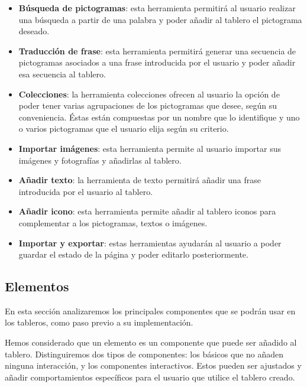 \begin{itemize}
	\item \textbf{Búsqueda de pictogramas}: esta herramienta permitirá al usuario realizar una búsqueda a partir de una palabra y poder añadir al tablero el pictograma deseado.
	
	\item \textbf{Traducción de frase}: esta herramienta permitirá generar una secuencia de pictogramas asociados a una frase introducida por el usuario y poder añadir esa secuencia al tablero.
	
	\item \textbf{Colecciones}: la herramienta colecciones ofrecen al usuario la opción de poder tener varias agrupaciones de los pictogramas que desee, según su conveniencia. Éstas están compuestas por un nombre que lo identifique y uno o varios pictogramas que el usuario elija según su criterio.
	
	\item \textbf{Importar imágenes}: esta herramienta permite al usuario importar sus imágenes y fotografías y añadirlas al tablero. 
	
	\item \textbf{Añadir texto}: la herramienta de texto permitirá añadir una frase introducida por el usuario al tablero. 
	
	\item \textbf{Añadir icono}: esta herramienta permite añadir al tablero iconos para complementar a los pictogramas, textos o imágenes.
	
	\item \textbf{Importar y exportar}: estas herramientas ayudarán al usuario a poder guardar el estado de la página y poder editarlo posteriormente. 
	
	
\end{itemize}

\subsection{Elementos}


En esta sección analizaremos los principales componentes que se podrán usar en los tableros, como paso previo a su implementación.

Hemos considerado que un elemento es un componente que puede ser añadido al tablero. Distinguiremos dos tipos de componentes: los básicos que no añaden ninguna interacción, y los componentes interactivos. Estos pueden ser ajustados y añadir comportamientos específicos para el usuario que utilice el tablero creado.

